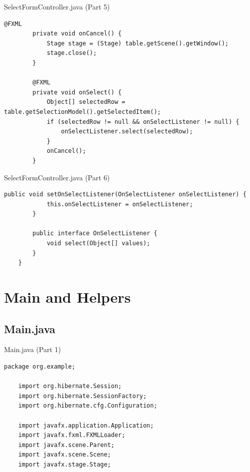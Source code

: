 \documentclass[aspectratio=169, table]{beamer}
\begin{document}
\begin{frame}[fragile]{SelectFormController.java (Part 5)}
	\vspace{20pt}
	\begin{lstlisting}[style=JavaStyle]
		@FXML
		private void onCancel() {
			Stage stage = (Stage) table.getScene().getWindow();
			stage.close();
		}
		
		@FXML
		private void onSelect() {
			Object[] selectedRow = table.getSelectionModel().getSelectedItem();
			if (selectedRow != null && onSelectListener != null) {
				onSelectListener.select(selectedRow);
			}
			onCancel();
		}
	\end{lstlisting}
\end{frame}

\begin{frame}[fragile]{SelectFormController.java (Part 6)}
	\vspace{20pt}
	\begin{lstlisting}[style=JavaStyle]
		public void setOnSelectListener(OnSelectListener onSelectListener) {
			this.onSelectListener = onSelectListener;
		}
		
		public interface OnSelectListener {
			void select(Object[] values);
		}
	}
\end{lstlisting}
\end{frame}

\section{Main and Helpers}
\subsection{Main.java}
\begin{frame}[fragile]{Main.java (Part 1)}
\vspace{20pt}
\begin{lstlisting}[style=JavaStyle]
	package org.example;
	
	import org.hibernate.Session;
	import org.hibernate.SessionFactory;
	import org.hibernate.cfg.Configuration;
	
	import javafx.application.Application;
	import javafx.fxml.FXMLLoader;
	import javafx.scene.Parent;
	import javafx.scene.Scene;
	import javafx.stage.Stage;
\end{lstlisting}
\end{frame}
\end{document}
